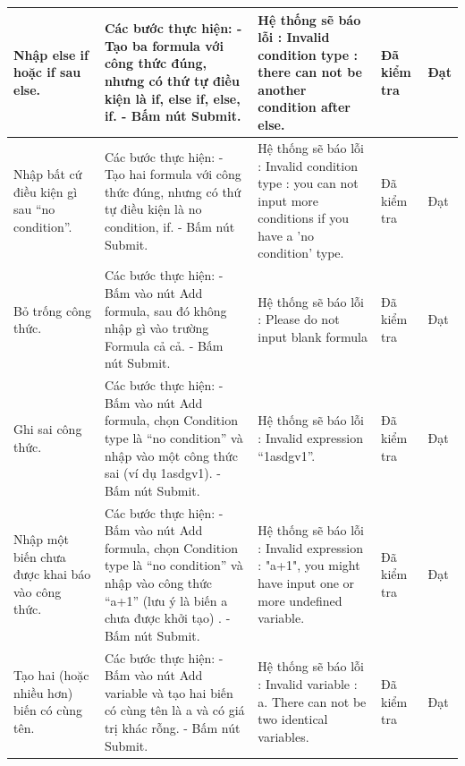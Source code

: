 \documentclass{article}
\begin{document}
\begin{longtable}{ | p{} |p{} | p{}  | p{}  | p{}  | }
\hline
Nhập else if hoặc if sau else. &
Các bước thực hiện: \newline
- Tạo ba formula với công thức đúng, nhưng có thứ tự điều kiện là if, else if, else, if. \newline
- Bấm nút Submit.
&
Hệ thống sẽ báo lỗi : Invalid condition type : there can not be another condition after else.
&
Đã kiểm tra &
Đạt \\

\hline
Nhập bất cứ điều kiện gì sau “no condition”. &
Các bước thực hiện: \newline
- Tạo hai formula với công thức đúng, nhưng có thứ tự điều kiện là no condition, if.\newline
- Bấm nút Submit.
&
Hệ thống sẽ báo lỗi : Invalid condition type : you can not input more conditions if you have a 'no condition' type.
&
Đã kiểm tra &
Đạt \\

\hline
Bỏ trống công thức. &
Các bước thực hiện: \newline
- Bấm vào nút Add formula, sau đó không nhập gì vào trường Formula cả cả. \newline
- Bấm nút Submit.  
&
Hệ thống sẽ báo lỗi : Please do not input blank formula
&
Đã kiểm tra &
Đạt \\

\hline
Ghi sai công thức. &
Các bước thực hiện: \newline
- Bấm vào nút Add formula, chọn Condition type là “no condition” và nhập vào một công thức sai (ví dụ 1asdgv1). \newline
- Bấm nút Submit.  
&
Hệ thống sẽ báo lỗi : Invalid expression “1asdgv1”.
&
Đã kiểm tra &
Đạt \\

\hline
Nhập một biến chưa được khai báo vào công thức. &
Các bước thực hiện: \newline
- Bấm vào nút Add formula, chọn Condition type là “no condition” và nhập vào công thức “a+1” (lưu ý là biến a chưa được khởi tạo) . \newline
- Bấm nút Submit.  
&
Hệ thống sẽ báo lỗi : Invalid expression : "a+1", you might have input one or more undefined variable.
&
Đã kiểm tra &
Đạt \\

\hline
Tạo hai (hoặc nhiều hơn) biến có cùng tên. &
Các bước thực hiện: \newline
- Bấm vào nút Add variable và tạo hai biến có cùng tên là a và có giá trị khác rỗng. \newline
- Bấm nút Submit.  
&
Hệ thống sẽ báo lỗi : Invalid variable : a. There can not be two identical variables.
&
Đã kiểm tra &
Đạt \\


\end{longtable}
\end{document}
